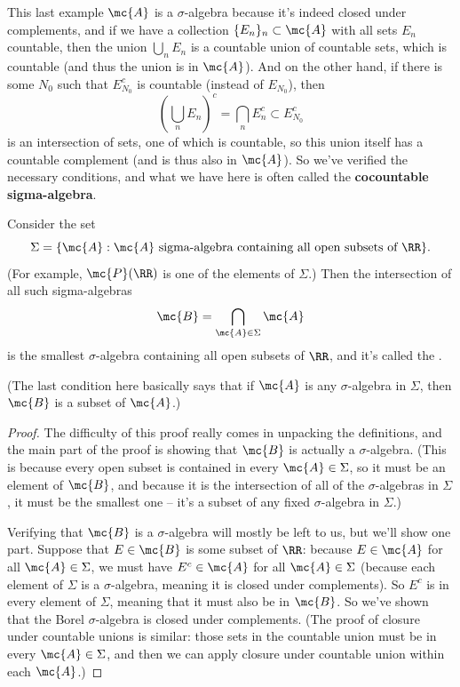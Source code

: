 This last example $\mc{A}$ is a $\sigma$-algebra because it's indeed closed under complements, and if we have a collection $\{E_n\}_n \subset \mc{A}$ with all sets $E_n$ countable, then the union $\bigcup_{n} E_n$ is a countable union of countable sets, which is countable (and thus the union is in $\mc{A}$). And on the other hand, if there is some $N_0$ such that $E_{N_0}^c$ is countable (instead of $E_{N_0}$), then
\[
    \left(\bigcup_n E_n\right)^c = \bigcap_{n} E_n^c \subset E_{N_0}^c
\]  
is an intersection of sets, one of which is countable, so this union itself has a countable complement (and is thus also in $\mc{A}$). So we've verified the necessary conditions, and what we have here is often called the \textbf{cocountable sigma-algebra}.

\begin{proposition}
Consider the set 
\[
    \Sigma = \{\mc{A}: \mc{A} \text{ sigma-algebra containing all open subsets of }\RR\}.
\]
(For example, $\mc{P}(\RR)$ is one of the elements of $\Sigma$.) Then the intersection of all such sigma-algebras
\[
    \mc{B} = \bigcap_{\mc{A} \in \Sigma} \mc{A}
\]
is the smallest $\sigma$-algebra containing all open subsets of $\RR$, and it's called the .
\end{proposition}

(The last condition here basically says that if $\mc{A}$ is any $\sigma$-algebra in $\Sigma$, then $\mc{B}$ is a subset of $\mc{A}$.)

\begin{proof}
The difficulty of this proof really comes in unpacking the definitions, and the main part of the proof is showing that $\mc{B}$ is actually a $\sigma$-algebra. (This is because every open subset is contained in every $\mc{A} \in \Sigma$, so it must be an element of $\mc{B}$, and because it is the intersection of all of the $\sigma$-algebras in $\Sigma$, it must be the smallest one -- it's a subset of any fixed $\sigma$-algebra in $\Sigma$.)

Verifying that $\mc{B}$ is a $\sigma$-algebra will mostly be left to us, but we'll show one part. Suppose that $E \in \mc{B}$ is some subset of $\RR$: because $E \in \mc{A}$ for all $\mc{A} \in \Sigma$, we must have $E^c \in \mc{A}$ for all $\mc{A} \in \Sigma$ (because each element of $\Sigma$ is a $\sigma$-algebra, meaning it is closed under complements). So $E^c$ is in every element of $\Sigma$, meaning that it must also be in $\mc{B}$. So we've shown that the Borel $\sigma$-algebra is closed under complements. (The proof of closure under countable unions is similar: those sets in the countable union must be in every $\mc{A} \in \Sigma$, and then we can apply closure under countable union within each $\mc{A}$.)
\end{proof}

